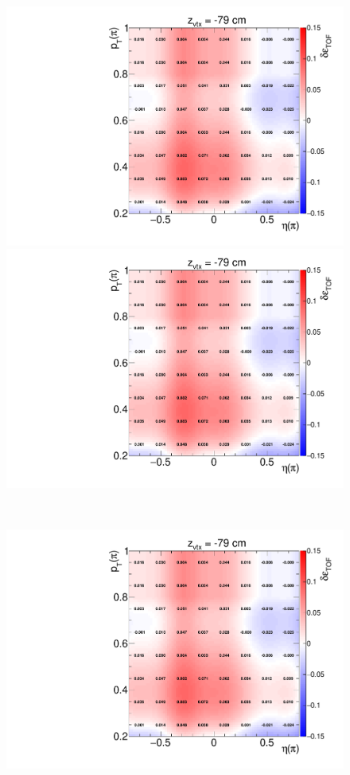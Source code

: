 \begin{figure}[ht]\ContinuedFloat
 \centering
	\parbox{0.325\textwidth}{
		\centering
		\includegraphics[width=\linewidth,page=56]{graphics/systematicsEfficiency/TOF_tagAndProbe/correction/TofEffCorrection3D_pion.pdf}\\
		\includegraphics[width=\linewidth,page=71]{graphics/systematicsEfficiency/TOF_tagAndProbe/correction/TofEffCorrection3D_pion.pdf}
	}~
	\parbox{0.325\textwidth}{
		\centering
		\includegraphics[width=\linewidth,page=61]{graphics/systematicsEfficiency/TOF_tagAndProbe/correction/TofEffCorrection3D_pion.pdf}\\
}
\end{figure}
